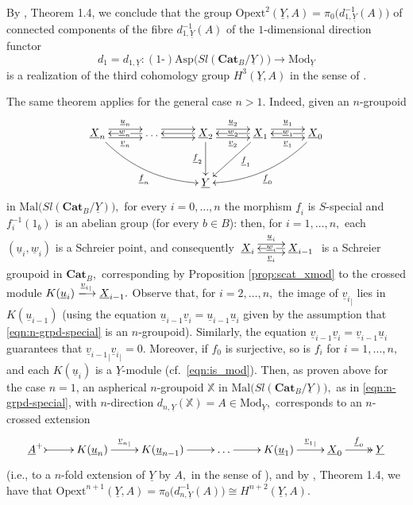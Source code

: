 \documentclass[11pt]{amsart}
\theoremstyle{plain}
\theoremstyle{definition}
\theoremstyle{remark}
\newcommand{\un}{\underline}
\begin{document}
By \cite{golasinski}, Theorem 1.4, we conclude that the group $\mathrm{Opext}^2(\un{Y},A)=\pi_0\big(d_{1,\un{Y}}^{-1}(A)\big)$ of connected components of the fibre $d_{1,\un{Y}}^{-1}(A)$ of the $1$-dimensional direction functor
\begin{equation*}
d_1=d_{1,\un{Y}}\colon (1\text{-})\mathrm{Asp}\big(Sl(\mathbf{Cat}_B/\un{Y})\big)\longrightarrow\mathrm{Mod}_{\un{Y}}
\end{equation*}
is a realization of the third cohomology group $H^3(\un{Y},A)$ in the sense of \cite{cocat}.

The same theorem applies for the general case $n>1.$ Indeed, given an $n$-groupoid
\begin{equation}
\label{eqn:n-grpd-special}
\begin{aligned}
\xymatrixrowsep{2.5pc}
\xymatrixcolsep{2.5pc}
\xymatrix{
{\un{X}_n} \ar@/_1pc/[rrd]_-{\un{f}_n} \ar@<.9ex>[r]^-{\un{u}_n} \ar@<-.9ex>[r]_-{\un{v}_n}  &{\dots} \ar[l]|{\un{w}_n} \ar@<.9ex>[r] \ar@<-.9ex>[r] &{\un{X}_2} \ar[d]_-{\un{f}_2} \ar[l] \ar@<.9ex>[r]^-{\un{u}_2} \ar@<-.9ex>[r]_-{\un{v}_2} &{\un{X}_1} \ar[ld]^(.40){\un{f}_1} \ar[l]|-{\un{w}_2}  \ar@<.9ex>[r]^-{\un{u}_1} \ar@<-.9ex>[r]_-{\un{v}_1} &{\un{X}_0} \ar@/^1pc/[lld]^-{\un{f}_0} \ar[l]|-{\un{w}_1} \\
&\ &{\un{Y}}
}
\end{aligned}
\end{equation}
in $\mathrm{Mal}\big(Sl(\mathbf{Cat}_B/\un{Y})\big),$ for every $i=0,\dots,n$ the morphism $\un{f}_i$ is $S$-special and $f_i^{-1}(1_b)$ is an abelian group (for every $b\in B$): then, for $i=1,\dots,n,$ each $(\un{u}_i,\un{w}_i)$ is a Schreier point, and consequently $\xymatrix{ {\un{X}_i} \ar@<.9ex>[r]^-{\un{u}_i} \ar@<-.9ex>[r]_-{\un{v}_i} &{\un{X}_{i-1}} \ar[l]|-{\un{w}_i}}$ is a Schreier groupoid in $\mathbf{Cat}_B,$ corresponding by Proposition \ref{prop:scat_xmod} to the crossed module $K(\un{u}_i)\xlongrightarrow{{\un{v}_i}_|}\un{X}_{i-1}.$ Observe that, for $i=2,\dots,n,$ the image of ${\un{v}_i}_|$ lies in $K(\un{u}_{i-1})$ (using the equation $\un{u}_{i-1}\un{v}_i=\un{u}_{i-1}\un{u}_i$ given by the assumption that \eqref{eqn:n-grpd-special} is an $n$-groupoid). Similarly, the equation $\un{v}_{i-1}\un{v}_i=\un{v}_{i-1}\un{u}_i$ guarantees that ${\un{v}_{i-1}}_|{\un{v}_i}_|=0.$ Moreover, if $f_0$ is surjective, so is $f_i$ for $i=1,\dots,n,$ and each $K(\un{u}_i)$ is a $\un{Y}$-module (cf.~\eqref{eqn:is_mod}).
Then, as proven above for the case $n=1$, an aspherical $n$-groupoid $\mathbb{X}$ in $\mathrm{Mal}\big(Sl(\mathbf{Cat}_B/\un{Y})\big),$ as in \eqref{eqn:n-grpd-special}, with $n$-direction $d_{n,\un{Y}}(\mathbb{X})=A\in\mathrm{Mod}_{\un{Y}},$ corresponds to an $n$-crossed extension
\begin{equation*}
 \xymatrix{{\un{A}^+} \ar@{>->}[r] &{K(\un{u}_n)} \ar[r]^-{{\un{v}_n}_|} &{K(\un{u}_{n-1})} \ar[r] &{\dots} \ar[r] &{K(\un{u}_1)}  \ar[r]^-{{\un{v}_1}_|} &{\un{X}_0} \ar@{->>}[r]^-{\un{f}_0} &{\un{Y}} }
 \end{equation*}
 (i.e., to a $n$-fold extension of $\un{Y}$ by $A,$ in the sense of \cite{golasinski}), and by \cite{golasinski}, Theorem 1.4, we have that $\mathrm{Opext}^{n+1}(\un{Y},A)=\pi_0\big(d_{n,\un{Y}}^{-1}(A)\big)\cong H^{n+2}(\un{Y},A).$
\end{document}
